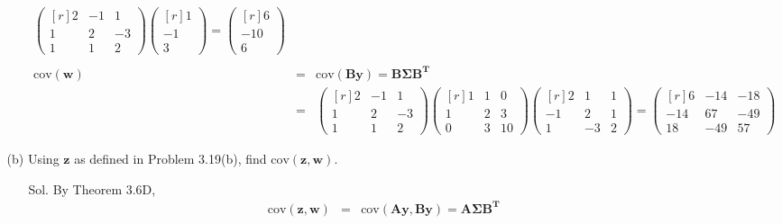 \documentclass[12pt]{article} %
\begin{document}
\begin{enumerate}
\begin{enumerate}
\begin{enumerate}
\begin{eqnarray*}
\begin{pmatrix}[r]
					2 & -1 &  1 \\
					1 &  2 & -3 \\
					1 &  1 &  2				  	
				  \end{pmatrix}
				  \begin{pmatrix}[r]
					 1 \\
				    -1 \\
					 3			 					  
				  \end{pmatrix}
				  =
				  \begin{pmatrix}[r]
					  6\\
				    -10\\
					  6				  
				  \end{pmatrix}\\
				  \\
				  \mathrm{cov}(\mathbf{w})&=&\mathrm{cov}(\mathbf{By})=\mathbf{B\Sigma B^{T}}\\
				  &=&
				  \begin{pmatrix}[r]
					2 & -1 &  1 \\
					1 &  2 & -3  \\
					1 &  1 &  2				  	
				  \end{pmatrix}	
				\begin{pmatrix}[r]
					1 & 1 & 0 \\
					1 & 2 & 3 \\
					0 & 3 & 10 
				\end{pmatrix}
				  \begin{pmatrix}[r]
					 2 &  1 & 1 \\
					-1 &  2 & 1  \\
					 1 & -3 & 2				  	
				  \end{pmatrix}
				  =
				  \begin{pmatrix}[r]
					  6 & -14 & -18 \\
			  	    -14 & 67 &  -49 \\
					 18 &-49 &   57 
				  \end{pmatrix}			  							    	  
			    \end{eqnarray*}
			\end{enumerate}
		\item[(b)] Using $\mathbf{z}$ as defined in Problem 3.19(b), find $\mathrm{cov}(\mathbf{z, w})$.			
			\begin{enumerate}
				\item[Sol.] By Theorem 3.6D, 
					\begin{eqnarray*}
						\mathrm{cov}(\mathbf{z, w})&=&\mathrm{cov}(\mathbf{Ay, By})=\mathbf{A\Sigma B^{T}}	\\

\end{eqnarray*}
\end{enumerate}
\end{enumerate}
\end{enumerate}
\end{document}
